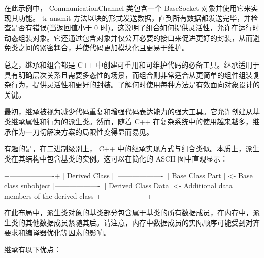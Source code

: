在此示例中， CommunicationChannel 类包含一个 BaseSocket 对象并使用它来实现其功能。 tr ansmit 方法以块的形式发送数据，直到所有数据都发送完毕，并检查是否有错误(当返回值小于 0 时)。这说明了组合如何提供灵活性，允许在运行时动态组装对象。它还通过包含对象并仅公开必要的接口来促进更好的封装，从而避免类之间的紧密耦合，并使代码更加模块化且更易于维护。

总之，继承和组合都是 C++ 中创建可重用和可维护代码的必备工具。继承适用于具有明确层次关系且需要多态性的场景，而组合则非常适合从更简单的组件组装复杂行为，提供灵活性和更好的封装。了解何时使用每种方法是有效面向对象设计的关键。


最初，继承被视为减少代码重复和增强代码表达能力的强大工具。它允许创建从基类继承属性和行为的派生类。然而，随着 C++ 在复杂系统中的使用越来越多，继承作为一刀切解决方案的局限性变得显而易见。


有趣的是，在二进制级别上， C++ 中的继承实现方式与组合类似。本质上，派生类在其结构中包含基类的实例。这可以在简化的 ASCII 图中直观显示：

\begin{shell}
+-------------------+
| Derived Class     |
|-------------------|
| Base Class Part   | <- Base class subobject
|-------------------|
| Derived Class Data| <- Additional data members of the derived class
+-------------------+
\end{shell}

在此布局中，派生类对象的基类部分包含属于基类的所有数据成员，在内存中，派生类的其他数据成员紧随其后。请注意，内存中数据成员的实际顺序可能受到对齐要求和编译器优化等因素的影响。


继承有以下优点：

